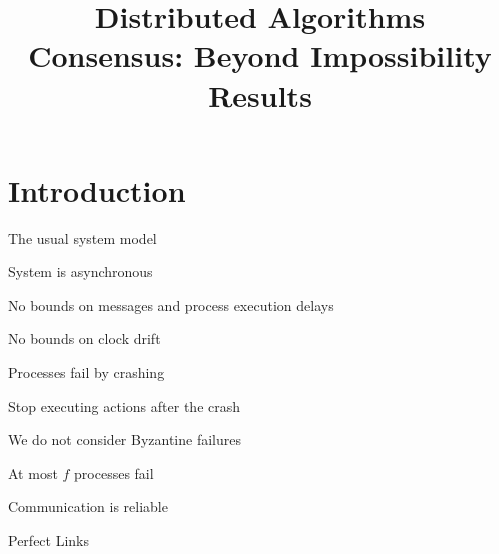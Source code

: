 
\title[DS - FD \& Consensus]{\textbf{Distributed Algorithms}\\Consensus: Beyond Impossibility Results}

\graphicspath{{figs/07/}}




\newcommand{\Crashed}{\mathit{crashed}}
\newcommand{\Correct}{\mathit{correct}}
\newcommand{\Suspected}{\mathit{suspected}}
\newcommand{\Est}{\mathit{est}}
\newcommand{\Aux}{\mathit{aux}}
\newcommand{\Rec}{\mathit{rec}}
\newcommand{\Proc}{\mathit{proc}}
\newcommand{\Stop}{\mathit{stop}}

\newcommand{\SUSPECT}{\textsc{suspect}}
\newcommand{\PHASEA}{\textsc{phase1}}
\newcommand{\PHASEB}{\textsc{phase2}}
\newcommand{\DECIDE}{\textsc{decide}}
\newcommand{\REPORT}{\textsc{report}}
\newcommand{\PROPOSAL}{\textsc{proposal}}

\newcommand{\Random}{\fontproc{random}}

\FrameTitle{}
\FrameContent

\section{Introduction}

\begin{frame}{The usual system model}


	
\BIL

\item \alert{System is asynchronous}
	\BI
	\item No bounds on messages and process execution delays
	\item No bounds on clock drift
	\EI
	
\item \alert{Processes fail by crashing}
	\BI
	\item Stop executing actions after the crash
	\item We do not consider Byzantine failures
	\item At most $f$ processes fail
	\EI

\item \alert{Communication is reliable}

	\BI
	\item Perfect Links
	\EI

\EIL

\end{frame}

